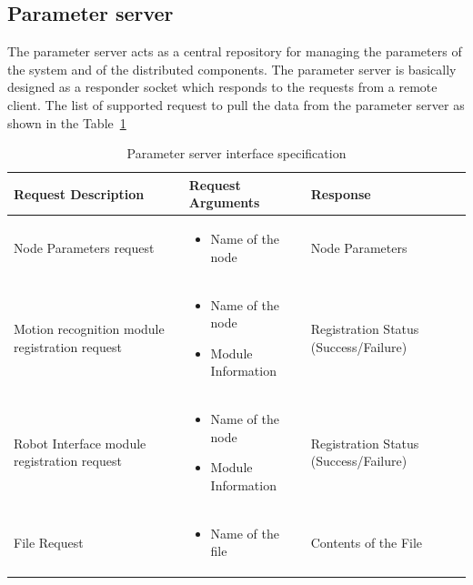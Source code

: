 \subsection*{Parameter server} 
The parameter server acts as a central repository for managing the parameters of the system and of the distributed components. The parameter server is basically designed as a responder socket which responds to the requests from a remote client. The list of supported request to pull the data from the parameter server as shown in the Table~\ref{table:parameter_server}
\begin{table}[H]
\centering
\small
\caption{Parameter server interface specification}
\label{table:parameter_server}
\begin{tabular}{| p{5cm} | p{4cm} | p{2.8cm} |}
\hline
  \textbf{Request Description} & \textbf{Request Arguments} & \textbf{Response}
  \tabularnewline \hline
  Node Parameters request & \begin{itemize}[leftmargin=*,topsep={0pt},itemsep={0pt},partopsep={0pt},parsep={0pt}] 
                                                  \item Name of the node
                                                  \end{itemize} & Node Parameters 
                                          \tabularnewline\hline
                                          
  Motion recognition module registration request &  \begin{itemize}[leftmargin=*,topsep={0pt},itemsep={0pt},partopsep={0pt},parsep={0pt}] 
                                                  \item Name of the node
                                                  \item Module Information
                                                \end{itemize} & Registration Status  (Success/Failure)
                                          \tabularnewline\hline
  
  Robot Interface module registration request & \begin{itemize}[leftmargin=*,topsep={0pt},itemsep={0pt},partopsep={0pt},parsep={0pt}] 
                                                \item Name of the node
                                                \item Module Information
                                            \end{itemize} & Registration Status  (Success/Failure)
                                          \tabularnewline\hline
  File Request & \begin{itemize}[leftmargin=*,topsep={0pt},itemsep={0pt},partopsep={0pt},parsep={0pt}] 
                                                  \item Name of the file
                                                  \end{itemize} & Contents of the File  
  										 \tabularnewline\hline
\end{tabular}
\end{table}
